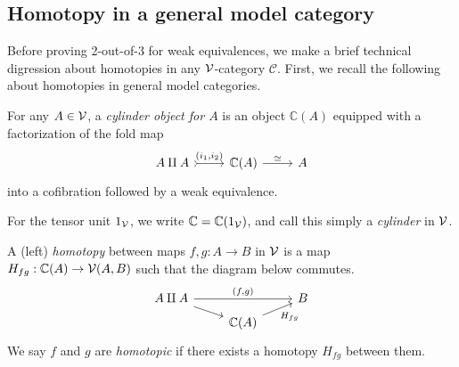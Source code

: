\documentclass[a4paper,10pt
,draft
]{article}%
\renewcommand{\1}{\eta}%
\begin{document}
\subsection{Homotopy in a general model category}

Before proving 2-out-of-3 for weak equivalences, we make a brief technical digression about homotopies in any $\mathcal V$-category $\mathcal C$.
First, we recall the following about homotopies in general model categories.
\begin{definition}
      For any $A \in \mathcal V$, a \textit{cylinder object for $A$} is an object $\mathbb C(A)$ equipped with a factorization of the fold map
      \begin{equation}
            \begin{tikzcd}
                  A \amalg A \arrow[r, tail, "{(i_1,i_2)}"]
                  &
                  \mathbb C(A) \arrow[r, "\simeq"]
                  &
                  A
            \end{tikzcd}
      \end{equation}
      into a cofibration followed by a weak equivalence.
      
      For the tensor unit $1_{\mathcal V}$, we write $\mathbb C = \mathbb C(1_{\mathcal V})$, and call this simply a \textit{cylinder} in $\mathcal V$.
      
      A (left) \textit{homotopy} between maps $f,g: A \to B$ in $\mathcal V$ is a map $H_{fg}: \mathbb C(A) \to \mathcal V(A,B)$ such that
      the diagram below commutes.
      \begin{equation}
            \begin{tikzcd}[row sep = tiny]
                  A \amalg A \arrow[rr, "{(f,g)}"] \arrow[dr]
                  &&
                  B
                  \\
                  &
                  \mathbb C(A) \arrow[ur, "H_{fg}"']
            \end{tikzcd}
      \end{equation}
      We say $f$ and $g$ are \textit{homotopic} if there exists a homotopy $H_{f g}$ between them.
\end{definition}

\end{document}
